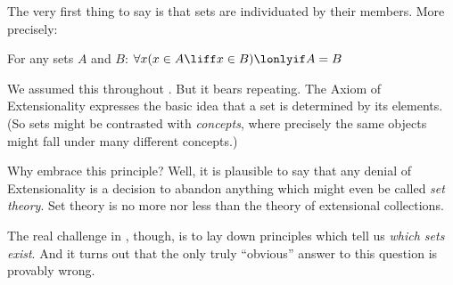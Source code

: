 \documentclass[../../../include/open-logic-section]{subfiles}
\begin{document}

The very first thing to say is that sets are individuated by their
members. More precisely:

\begin{axiom}[Extensionality]
For any sets $A$ and $B$: $\forall x(x \in A \liff x \in B) \lonlyif A = B$
\end{axiom}

We assumed this throughout . But it bears
repeating. The Axiom of Extensionality expresses the basic idea that a
set is determined by its elements. (So sets might be contrasted with
\emph{concepts}, where precisely the same objects might fall under
many different concepts.) 

Why embrace this principle? Well, it is plausible to say that any
denial of Extensionality is a decision to abandon anything which might
even be called \emph{set theory}. Set theory is no more nor less than
the theory of extensional collections. 

The real challenge in , though, is to lay
down principles which tell us \emph{which sets exist}. And it turns
out that the only truly ``obvious'' answer to this question is
provably wrong.
\end{document}
